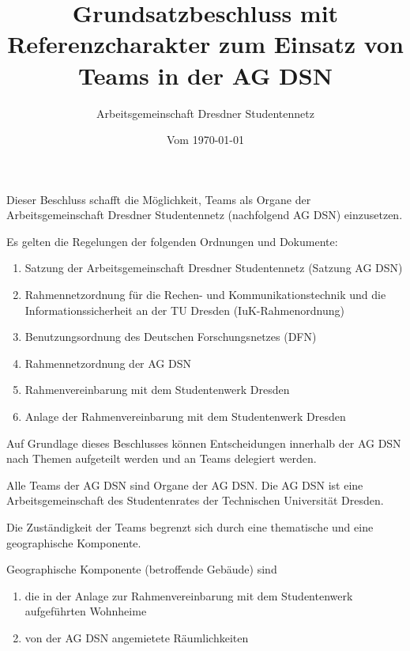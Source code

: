 \documentclass[draft,parskip=half-,DIV=12,mpinclude]{scrartcl}
\begin{document}
\title{Grundsatzbeschluss mit Referenzcharakter zum Einsatz von Teams in der AG DSN}
\author{Arbeitsgemeinschaft Dresdner Studentennetz}
\date{Vom \today}
\maketitle

\begin{contract}


Dieser Beschluss schafft die Möglichkeit, Teams als Organe der Arbeitsgemeinschaft Dresdner Studentennetz (nachfolgend AG DSN) einzusetzen.

Es gelten die Regelungen der folgenden Ordnungen und Dokumente:
\begin{enumerate}
  \item Satzung der Arbeitsgemeinschaft Dresdner Studentennetz (Satzung AG DSN)
  \item Rahmennetzordnung für die Rechen- und Kommunikationstechnik und die Informationssicherheit an der TU Dresden (IuK-Rahmenordnung)
  \item Benutzungsordnung des Deutschen Forschungsnetzes (DFN)
  \item Rahmennetzordnung der AG DSN
  \item Rahmenvereinbarung mit dem Studentenwerk Dresden
  \item Anlage der Rahmenvereinbarung mit dem Studentenwerk Dresden
\end{enumerate}

Auf Grundlage dieses Beschlusses können Entscheidungen innerhalb der AG DSN nach Themen aufgeteilt werden und an Teams delegiert werden.


Alle Teams der AG DSN sind Organe der AG DSN. Die AG DSN ist eine Arbeitsgemeinschaft des Studentenrates der Technischen Universität Dresden.

Die Zuständigkeit der Teams begrenzt sich durch eine thematische und eine geographische Komponente.

Geographische Komponente (betroffende Gebäude) sind
\begin{enumerate}
  \item die in der Anlage zur Rahmenvereinbarung mit dem Studentenwerk aufgeführten Wohnheime
  \item von der AG DSN angemietete Räumlichkeiten
\end{enumerate}


\end{contract}
\end{document}
